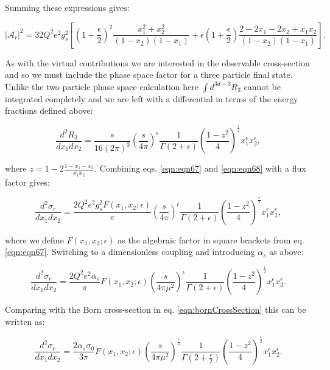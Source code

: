			Summing these expressions gives:

			\begin{equation}
				|\mathcal{A}_r|^2 = 32Q^2e^2g_s^2\left[\left(1+\frac{\epsilon}{2}\right)^2\frac{x_1^2+x_2^2}{(1-x_2)(1-x_1)} +
				\epsilon\left(1+\frac{\epsilon}{2}\right)\frac{2-2x_1-2x_2+x_1x_2}{(1-x_2)(1-x_1)}\right].
				\label{eqn:eqn67}
			\end{equation}

			As with the virtual contributions we are interested in the observable cross-section and so we must
			include the phase space factor for a three particle final state.  Unlike the two particle phase space
			calculation here $\int d^{3d-3}R_3$ cannot be integrated completely and we are left with a
			differential in terms of the energy fractions defined above:

			\begin{equation}
				\frac{d^2R_3}{dx_1dx_2} = \frac{s}{16(2\pi)^3}\left(\frac{s}{4\pi}\right)^\epsilon\frac{1}{\Gamma(2+\epsilon)}
				\left(\frac{1-z^2}{4}\right)^{\frac{\epsilon}{2}}x_1^\epsilon x_2^\epsilon,
				\label{eqn:eqn68}
			\end{equation}

			where $z = 1 - 2\frac{1-x_1-x_2}{x_1x_2}$.  Combining eqs. \eqref{eqn:eqn67} and \eqref{eqn:eqn68} with a flux factor gives:

			\begin{equation}
				\frac{d^2\sigma_r}{dx_1dx_2} = \frac{2Q^2e^2g_s^2F(x_1, x_2; \epsilon)}{\pi}\left(\frac{s}{4\pi}\right)^\epsilon
				\frac{1}{\Gamma(2+\epsilon)}\left(\frac{1-z^2}{4}\right)^{\frac{\epsilon}{2}}x_1^\epsilon x_2^\epsilon,
			\end{equation}

			where we define $F(x_1, x_2; \epsilon)$ as the algebraic factor in square brackets from eq. \eqref{eqn:eqn67}.  Switching to
			a dimensionless coupling and introducing $\alpha_s$ as above:

			\begin{equation}
				\frac{d^2\sigma_r}{dx_1dx_2} = \frac{2Q^2e^2\alpha_s}{\pi}F(x_1, x_2; \epsilon)\left(\frac{s}{4\pi\mu^2}\right)^\epsilon
				\frac{1}{\Gamma(2+\epsilon)}\left(\frac{1-z^2}{4}\right)^{\frac{\epsilon}{2}}x_1^\epsilon x_2^\epsilon.
			\end{equation}

			Comparing with the Born cross-section in eq. \eqref{eqn:bornCrossSection} this can be written as:

			\begin{equation}
				\frac{d^2\sigma_r}{dx_1dx_2} = \frac{2\alpha_s\sigma_0}{3\pi}F(x_1, x_2; \epsilon)\left(\frac{s}{4\pi\mu^2}\right)^
				{\frac{\epsilon}{2}}\frac{1}{\Gamma(2+\frac{\epsilon}{2})}\left(\frac{1-z^2}{4}\right)^{\frac{\epsilon}{2}}x_1^\epsilon x_2^\epsilon.
			\end{equation}


